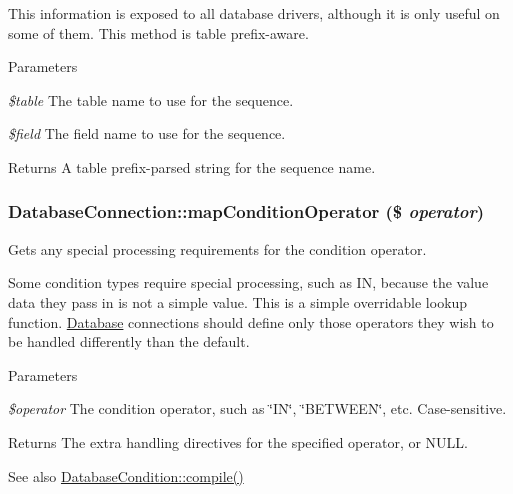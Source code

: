 This information is exposed to all database drivers, although it is only useful on some of them. This method is table prefix-\/aware.


\begin{DoxyParams}{Parameters}
\item[{\em \$table}]The table name to use for the sequence. \item[{\em \$field}]The field name to use for the sequence.\end{DoxyParams}
\begin{DoxyReturn}{Returns}
A table prefix-\/parsed string for the sequence name. 
\end{DoxyReturn}
\hypertarget{classDatabaseConnection_aef82436b30fa08a6c81c34e11f3b1717}{
\subsubsection[{mapConditionOperator}]{\setlength{\rightskip}{0pt plus 5cm}DatabaseConnection::mapConditionOperator (\$ {\em operator})}}
\label{classDatabaseConnection_aef82436b30fa08a6c81c34e11f3b1717}
Gets any special processing requirements for the condition operator.

Some condition types require special processing, such as IN, because the value data they pass in is not a simple value. This is a simple overridable lookup function. \hyperlink{classDatabase}{Database} connections should define only those operators they wish to be handled differently than the default.


\begin{DoxyParams}{Parameters}
\item[{\em \$operator}]The condition operator, such as \char`\"{}IN\char`\"{}, \char`\"{}BETWEEN\char`\"{}, etc. Case-\/sensitive.\end{DoxyParams}
\begin{DoxyReturn}{Returns}
The extra handling directives for the specified operator, or NULL.
\end{DoxyReturn}
\begin{DoxySeeAlso}{See also}
\hyperlink{classDatabaseCondition_a286df1af0dfaa7ab6b8b30ed4e96a830}{DatabaseCondition::compile()} 
\end{DoxySeeAlso}


